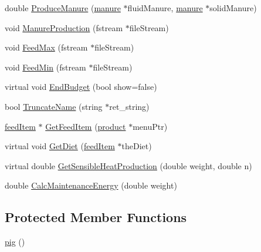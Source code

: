 \begin{DoxyCompactItemize}
\item 
double \hyperlink{classpig_af55a83b472d29ba2a254bd1ed6e2c4b5}{ProduceManure} (\hyperlink{classmanure}{manure} $\ast$fluidManure, \hyperlink{classmanure}{manure} $\ast$solidManure)
\item 
void \hyperlink{classpig_a3f4680b212a968f2e69c75b17dbd1010}{ManureProduction} (fstream $\ast$fileStream)
\item 
void \hyperlink{classpig_ab80efe296b0c878904a5cc98d7e12b32}{FeedMax} (fstream $\ast$fileStream)
\item 
void \hyperlink{classpig_aeb272e66e57b3dbc93ebdef9dbec7916}{FeedMin} (fstream $\ast$fileStream)
\item 
virtual void \hyperlink{classpig_aa3f9514039eb69dbe5ce8b44a398930e}{EndBudget} (bool show=false)
\item 
bool \hyperlink{classpig_ad9d9dc4d357e5cf07350b1681e67eca5}{TruncateName} (string $\ast$ret\_\-string)
\item 
\hyperlink{classfeed_item}{feedItem} $\ast$ \hyperlink{classpig_aafe346132ff6ab66abcb11400b41eac4}{GetFeedItem} (\hyperlink{classproduct}{product} $\ast$menuPtr)
\item 
virtual void \hyperlink{classpig_a8838d76bf26c0517ef1c79c0ff3c8988}{GetDiet} (\hyperlink{classfeed_item}{feedItem} $\ast$theDiet)
\item 
virtual double \hyperlink{classpig_a2c7c1a356646211e31753de053977520}{GetSensibleHeatProduction} (double weight, double n)
\item 
double \hyperlink{classpig_a054e084f2dd4b4db9ac06fb8eac96603}{CalcMaintenanceEnergy} (double weight)
\end{DoxyCompactItemize}
\subsection*{Protected Member Functions}
\begin{DoxyCompactItemize}
\item 
\hyperlink{classpig_af941f59904d0c80142ef3dd970c00e17}{pig} ()
\end{DoxyCompactItemize}

